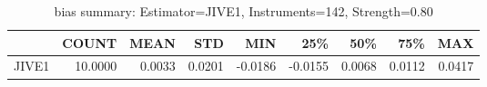 \begin{table}[ht]
\centering
\caption{bias summary: Estimator=JIVE1, Instruments=142, Strength=0.80}
\begin{tabular}{lrrrrrrrr}
\toprule
 & COUNT & MEAN & STD & MIN & 25\% & 50\% & 75\% & MAX \\
\midrule
JIVE1 & 10.0000 & 0.0033 & 0.0201 & -0.0186 & -0.0155 & 0.0068 & 0.0112 & 0.0417 \\
\bottomrule
\end{tabular}
\end{table}
